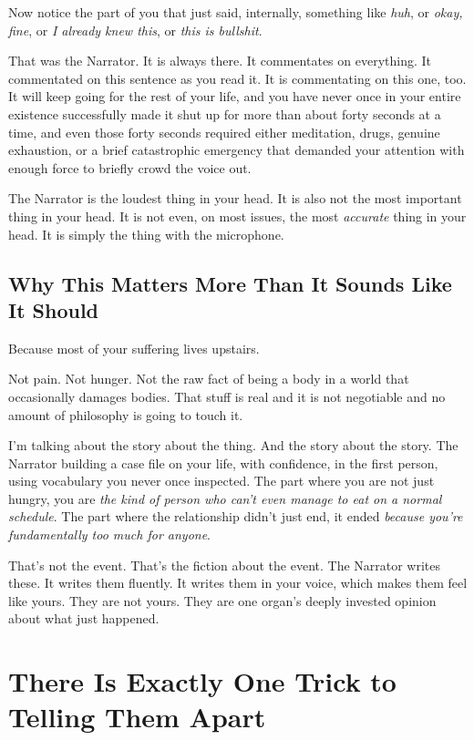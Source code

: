 \documentclass[11pt, letterpaper]{article}
\begin{document}
Now notice the part of you that just said, internally, something like \textit{huh}, or \textit{okay, fine}, or \textit{I already knew this}, or \textit{this is bullshit}.

That was the Narrator. It is always there. It commentates on everything. It commentated on this sentence as you read it. It is commentating on this one, too. It will keep going for the rest of your life, and you have never once in your entire existence successfully made it shut up for more than about forty seconds at a time, and even those forty seconds required either meditation, drugs, genuine exhaustion, or a brief catastrophic emergency that demanded your attention with enough force to briefly crowd the voice out.

The Narrator is the loudest thing in your head. It is also not the most important thing in your head. It is not even, on most issues, the most \textit{accurate} thing in your head. It is simply the thing with the microphone.

\subsection{Why This Matters More Than It Sounds Like It Should}

Because most of your suffering lives upstairs.

Not pain. Not hunger. Not the raw fact of being a body in a world that occasionally damages bodies. That stuff is real and it is not negotiable and no amount of philosophy is going to touch it.

I'm talking about the story about the thing. And the story about the story. The Narrator building a case file on your life, with confidence, in the first person, using vocabulary you never once inspected. The part where you are not just hungry, you are \textit{the kind of person who can't even manage to eat on a normal schedule}. The part where the relationship didn't just end, it ended \textit{because you're fundamentally too much for anyone}.

That's not the event. That's the fiction about the event. The Narrator writes these. It writes them fluently. It writes them in your voice, which makes them feel like yours. They are not yours. They are one organ's deeply invested opinion about what just happened.

\section{There Is Exactly One Trick to Telling Them Apart}
\end{document}

